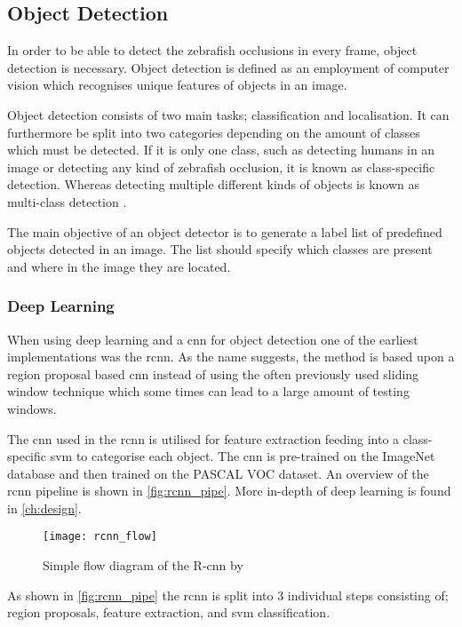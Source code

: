 \subsection{Object Detection}\label{sec:obj_det}
In order to be able to detect the zebrafish occlusions in every frame, object detection is necessary. Object detection is defined as an employment of computer vision which recognises unique features of objects in an image.

Object detection consists of two main tasks; classification and localisation. It can furthermore be split into two categories depending on the amount of classes which must be detected. If it is only one class, such as detecting humans in an image or detecting any kind of zebrafish occlusion, it is known as class-specific detection. Whereas detecting multiple different kinds of objects is known as multi-class detection  \citep{Zhang2013}.

The main objective of an object detector is to generate a label list of predefined objects detected in an image. The list should specify which classes are present and where in the image they are located.\\

\subsubsection{Deep Learning}
When using deep learning and a \gls{cnn} for object detection one of the earliest implementations was the \gls{rcnn}. As the name suggests, the method is based upon a region proposal based \gls{cnn} instead of using the often previously used sliding window technique which some times can lead to a large amount of testing windows.

The \gls{cnn} used in the \gls{rcnn} is utilised for feature extraction feeding into a class-specific \gls{svm} to categorise each object. The \gls{cnn} is pre-trained on the ImageNet database and then trained on the PASCAL VOC dataset. An overview of the \gls{rcnn} pipeline is shown in \autoref{fig:rcnn_pipe}. More in-depth of deep learning is found in \autoref{ch:design}.

\begin{figure}[h]
	\centering
	\texttt{[image: rcnn\_flow]}
	\caption{Simple flow diagram of the R-\gls{cnn} by \cite{Girshick2014}}
	\label{fig:rcnn_pipe}
\end{figure}

As shown in \autoref{fig:rcnn_pipe} the \gls{rcnn} is split into 3 individual steps consisting of; region proposals, feature extraction, and \gls{svm} classification.\\

